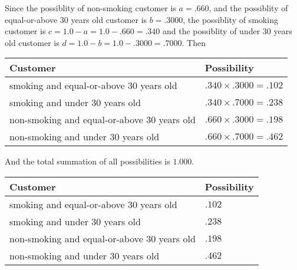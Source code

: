 \documentclass[12pt]{article}
\begin{document}
 
 
 
 
\noindent{}
 
 

Since the possiblity of  %
 non-smoking customer is $ a =  %
.660 $,
and the possiblity of  %
equal-or-above 30 years old customer is $ b =  %
.3000 $,
the possiblity of  %
smoking customer is $ c = 1.0 - a = 1.0 -
.660
=  %
.340 $ and the possiblity of  %
under 30 years old
customer is $ d = 1.0 - b = 1.0 -  %
.3000 =  %
.7000  $.
Then
 
\noindent
\begin{tabular}{|l|l|}
\hline
Customer & Possibility \\
\hline
smoking  and  %
equal-or-above 30 years old  &
  $ %
.340 \times  %
.3000 =  %
.102$ \\
\hline
smoking  and  %
under 30 years old &
  $ %
.340 \times  %
.7000 =  %
.238$ \\
\hline
 non-smoking and  %
equal-or-above 30 years old  &
  $ %
.660 \times  %
.3000 =  %
.198$ \\
\hline
 non-smoking and  %
under 30 years old &
  $ %
.660 \times  %
.7000 =  %
.462$ \\
\hline
\end{tabular}
 
\noindent
And the total summation of all possibilities is $  %
1.000 $.
 
 
 
 
\noindent{}
 
 

 
 
 
\noindent{}
 
 

 
\noindent
\begin{tabular}{|l|l|}
\hline
Customer & Possibility \\
\hline
smoking  and  %
equal-or-above 30 years old &
  $ %
.102$ \\
\hline
smoking  and  %
under 30 years old &
  $ %
.238$ \\
\hline
 non-smoking and  %
equal-or-above 30 years old &
  $ %
.198$ \\
\hline
 non-smoking and  %
under 30 years old &
  $ %
.462$ \\
\hline
\end{tabular}
 
\end{document}

